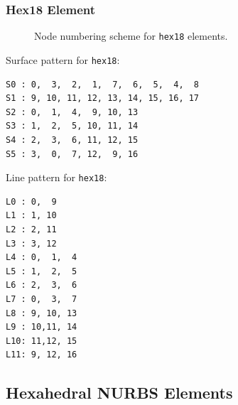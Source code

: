 \newpage
\subsubsection{Hex18 Element}
\begin{figure}[h!]
\begin{center}
\caption{Node numbering scheme for \texttt{hex18} elements.}
\label{fig:conventions:hex18}
\end{center}
\end{figure}

Surface pattern for \texttt{hex18}:
\begin{verbatim}
S0 : 0,  3,  2,  1,  7,  6,  5,  4,  8 
S1 : 9, 10, 11, 12, 13, 14, 15, 16, 17 
S2 : 0,  1,  4,  9, 10, 13
S3 : 1,  2,  5, 10, 11, 14
S4 : 2,  3,  6, 11, 12, 15 
S5 : 3,  0,  7, 12,  9, 16 
\end{verbatim}

Line pattern for \texttt{hex18}:
\begin{verbatim}
L0 : 0,  9
L1 : 1, 10
L2 : 2, 11 
L3 : 3, 12
L4 : 0,  1,  4
L5 : 1,  2,  5 
L6 : 2,  3,  6
L7 : 0,  3,  7
L8 : 9, 10, 13
L9 : 10,11, 14 
L10: 11,12, 15
L11: 9, 12, 16 
\end{verbatim}


\newpage
\subsection{Hexahedral NURBS Elements}

